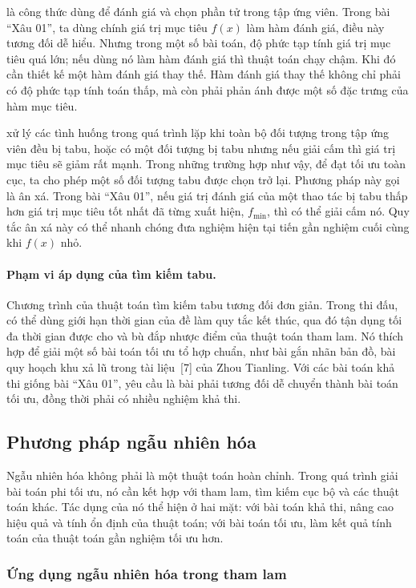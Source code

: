 \documentclass[11pt]{article}
\begin{document}
 là công thức dùng để đánh giá và chọn phần tử trong tập
ứng viên. Trong bài ``Xâu 01'', ta dùng chính giá trị mục tiêu \(f(x)\) làm
hàm đánh giá, điều này tương đối dễ hiểu. Nhưng trong một số bài toán, độ phức
tạp tính giá trị mục tiêu quá lớn; nếu dùng nó làm hàm đánh giá thì thuật toán
chạy chậm. Khi đó cần thiết kế một hàm đánh giá thay thế. Hàm đánh giá thay
thế không chỉ phải có độ phức tạp tính toán thấp, mà còn phải phản ánh được
một số đặc trưng của hàm mục tiêu.

 xử lý các tình huống trong quá trình lặp khi toàn bộ đối
tượng trong tập ứng viên đều bị tabu, hoặc có một đối tượng bị tabu nhưng nếu
giải cấm thì giá trị mục tiêu sẽ giảm rất mạnh. Trong những trường hợp như
vậy, để đạt tối ưu toàn cục, ta cho phép một số đối tượng tabu được chọn trở
lại. Phương pháp này gọi là ân xá. Trong bài ``Xâu 01'', nếu giá trị đánh giá
của một thao tác bị tabu thấp hơn giá trị mục tiêu tốt nhất đã từng xuất hiện,
\(f_{\min}\), thì có thể giải cấm nó. Quy tắc ân xá này có thể nhanh chóng đưa
nghiệm hiện tại tiến gần nghiệm cuối cùng khi \(f(x)\) nhỏ.

\paragraph{Phạm vi áp dụng của tìm kiếm tabu.}
Chương trình của thuật toán tìm kiếm tabu tương đối đơn giản. Trong thi đấu,
có thể dùng giới hạn thời gian của đề làm quy tắc kết thúc, qua đó tận dụng
tối đa thời gian được cho và bù đắp nhược điểm của thuật toán tham lam. Nó
thích hợp để giải một số bài toán tối ưu tổ hợp chuẩn, như bài gắn nhãn bản
đồ, bài quy hoạch khu xả lũ trong tài liệu~[7] của Zhou Tianling. Với các bài
toán khả thi giống bài ``Xâu 01'', yêu cầu là bài phải tương đối dễ chuyển
thành bài toán tối ưu, đồng thời phải có nhiều nghiệm khả thi.

\subsection{Phương pháp ngẫu nhiên hóa}

Ngẫu nhiên hóa không phải là một thuật toán hoàn chỉnh. Trong quá trình giải
bài toán phi tối ưu, nó cần kết hợp với tham lam, tìm kiếm cục bộ và các thuật
toán khác. Tác dụng của nó thể hiện ở hai mặt: với bài toán khả thi, nâng cao
hiệu quả và tính ổn định của thuật toán; với bài toán tối ưu, làm kết quả tính
toán của thuật toán gần nghiệm tối ưu hơn.

\subsubsection{Ứng dụng ngẫu nhiên hóa trong tham lam}
\end{document}
